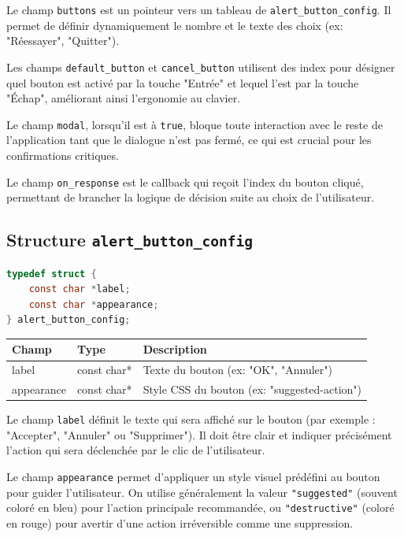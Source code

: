 Le champ \texttt{buttons} est un pointeur vers un tableau de \texttt{alert\_button\_config}. Il permet de définir dynamiquement le nombre et le texte des choix (ex: "Réessayer", "Quitter").

Les champs \texttt{default\_button} et \texttt{cancel\_button} utilisent des index pour désigner quel bouton est activé par la touche "Entrée" et lequel l'est par la touche "Échap", améliorant ainsi l'ergonomie au clavier.

Le champ \texttt{modal}, lorsqu'il est à \texttt{true}, bloque toute interaction avec le reste de l'application tant que le dialogue n'est pas fermé, ce qui est crucial pour les confirmations critiques.

Le champ \texttt{on\_response} est le callback qui reçoit l'index du bouton cliqué, permettant de brancher la logique de décision suite au choix de l'utilisateur.

\subsection{Structure \texttt{alert\_button\_config}}
\begin{lstlisting}[language=C]
typedef struct {
    const char *label;
    const char *appearance;
} alert_button_config;
\end{lstlisting}
\begin{center}
\begin{tabular}{|l|l|>{\raggedright\arraybackslash}p{6cm}|}
\hline
\textbf{Champ} & \textbf{Type} & \textbf{Description} \\
\hline
label & const char* & Texte du bouton (ex: "OK", "Annuler") \\
\hline
appearance & const char* & Style CSS du bouton (ex: "suggested-action") \\
\hline
\end{tabular}
\end{center}

\bigskip

Le champ \texttt{label} définit le texte qui sera affiché sur le bouton (par exemple : "Accepter", "Annuler" ou "Supprimer"). Il doit être clair et indiquer précisément l'action qui sera déclenchée par le clic de l'utilisateur.

Le champ \texttt{appearance} permet d'appliquer un style visuel prédéfini au bouton pour guider l'utilisateur. On utilise généralement la valeur \texttt{"suggested"} (souvent coloré en bleu) pour l'action principale recommandée, ou \texttt{"destructive"} (coloré en rouge) pour avertir d'une action irréversible comme une suppression.